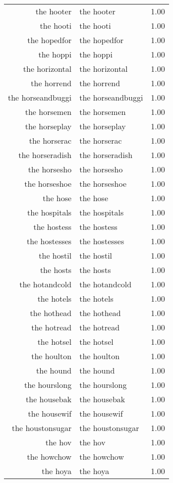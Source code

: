 \begin{table}[ht]
\begin{tabular}{rlr}
  the hooter & the hooter & 1.00 \\ 
  the hooti & the hooti & 1.00 \\ 
  the hopedfor & the hopedfor & 1.00 \\ 
  the hoppi & the hoppi & 1.00 \\ 
  the horizontal & the horizontal & 1.00 \\ 
  the horrend & the horrend & 1.00 \\ 
  the horseandbuggi & the horseandbuggi & 1.00 \\ 
  the horsemen & the horsemen & 1.00 \\ 
  the horseplay & the horseplay & 1.00 \\ 
  the horserac & the horserac & 1.00 \\ 
  the horseradish & the horseradish & 1.00 \\ 
  the horsesho & the horsesho & 1.00 \\ 
  the horseshoe & the horseshoe & 1.00 \\ 
  the hose & the hose & 1.00 \\ 
  the hospitals & the hospitals & 1.00 \\ 
  the hostess & the hostess & 1.00 \\ 
  the hostesses & the hostesses & 1.00 \\ 
  the hostil & the hostil & 1.00 \\ 
  the hosts & the hosts & 1.00 \\ 
  the hotandcold & the hotandcold & 1.00 \\ 
  the hotels & the hotels & 1.00 \\ 
  the hothead & the hothead & 1.00 \\ 
  the hotread & the hotread & 1.00 \\ 
  the hotsel & the hotsel & 1.00 \\ 
  the houlton & the houlton & 1.00 \\ 
  the hound & the hound & 1.00 \\ 
  the hourslong & the hourslong & 1.00 \\ 
  the housebak & the housebak & 1.00 \\ 
  the housewif & the housewif & 1.00 \\ 
  the houstonsugar & the houstonsugar & 1.00 \\ 
  the hov & the hov & 1.00 \\ 
  the howchow & the howchow & 1.00 \\ 
  the hoya & the hoya & 1.00 \\ 

\end{tabular}
\end{table}
